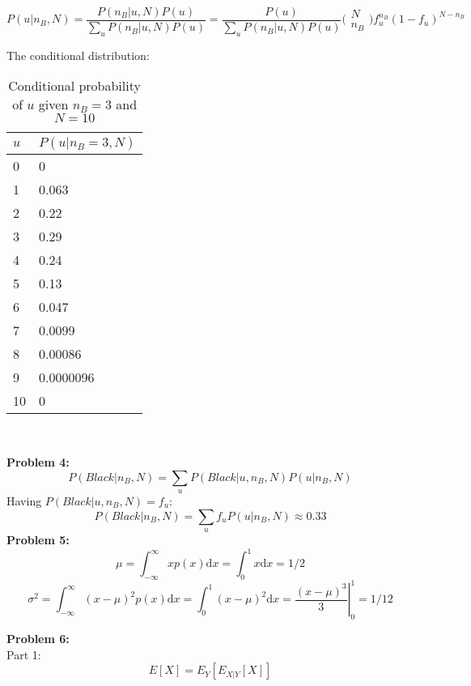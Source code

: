 \documentclass{article}
\begin{document}
\[P(u|n_B,N)=\frac{P(n_B|u,N)P(u)}{\sum_{u}{P(n_{B}|u,N)P(u)}} = 
 \frac{P(u)}{\sum_{u}{P(n_{B}|u,N)P(u)}}
 \bigl(\begin{smallmatrix}
    N \\
    n_B
  \end{smallmatrix}\bigr)
  f_{u}^{n_B}{(1-f_u)}^{N-n_B}\]

The conditional distribution:  
\begin{table}[h]
\begin{center}
	\begin{tabular}{l l}
	\toprule
	$u$ & $P(u|n_B=3,N)$ \\
	\midrule
	0 & 0 \\
	1 & 0.063 \\
	2 & 0.22 \\
	3 & 0.29 \\
	4 & 0.24 \\
	5 & 0.13 \\
	6 & 0.047 \\
	7 & 0.0099 \\
	8 & 0.00086 \\
	9 & 0.0000096 \\
	10 & 0 \\
	\bottomrule
	\end{tabular}\\
\caption{Conditional probability of $u$ given $n_B=3$ and $N=10$}
\end{center}
\end{table}

\textbf{Problem 4:}\\
\[P(Black|n_{B},N) = \sum_{u}{P(Black|u,n_{B},N)P(u|n_{B},N)}\]
Having $ P(Black|u,n_{B},N) = f_{u}$:
\[P(Black|n_{B},N) = \sum_{u}{f_{u}P(u|n_{B},N)} \approx 0.33\]
\textbf{Problem 5:}\\

\[ \mu=\int_{-\infty}^{\infty}xp(x)\mathrm{d}x=\int_{0}^{1}x\mathrm{d}x=1/2\]
\[ {\sigma}^2=\int_{-\infty}^{\infty}{(x-\mu)}^2p(x)\mathrm{d}x=\int_{0}^{1}{(x-\mu)}^2\mathrm{d}x=\left.\frac{{(x-\mu)}^3}{3}\right|_0^1=1/12\]

\newpage
\textbf{Problem 6:}\\
Part 1:
\[E[X] = E_Y[E_{X|Y}[X]]\]
\end{document}
